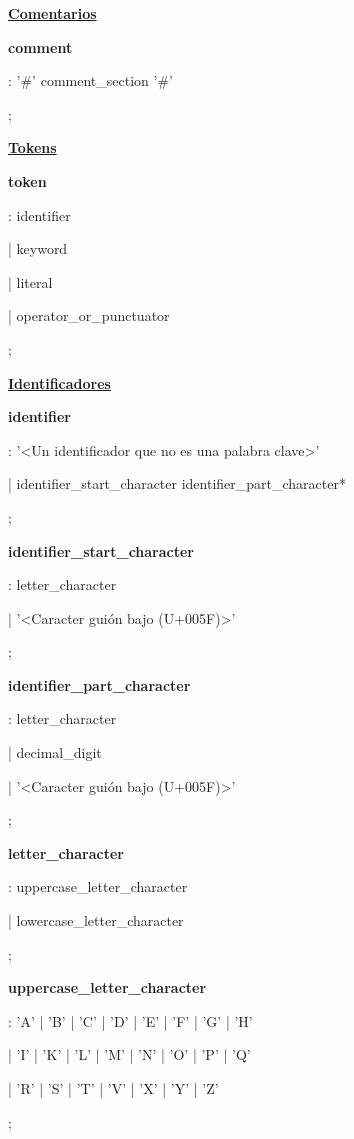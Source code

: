 		\underline{\textbf{Comentarios}}\par
		\textbf{comment}\par
		: '\#' comment\_section '\#'\par
		;\par
		
		\underline{\textbf{Tokens}}\par
		\textbf{token}\par
		: identifier\par
		| keyword\par
		| literal\par
		| operator\_or\_punctuator\par
		;\par
		
		\underline{\textbf{Identificadores}}\par
		\textbf{identifier}\par
		: '<Un identificador que no es una palabra clave>'\par
		| identifier\_start\_character identifier\_part\_character*\par
		;\par
		
		\textbf{identifier\_start\_character}\par
		: letter\_character\par
		| '<Caracter guión bajo (U+005F)>'\par
		;\par
		
		\textbf{identifier\_part\_character}\par
		: letter\_character\par
		| decimal\_digit\par
		| '<Caracter guión bajo (U+005F)>'\par
		;\par
		
		\textbf{letter\_character}\par
		: uppercase\_letter\_character\par
		| lowercase\_letter\_character\par
		;\par
		
		\textbf{uppercase\_letter\_character}\par
		: 'A' | 'B' | 'C' | 'D' | 'E' | 'F' | 'G' | 'H'\par 
		| 'I' | 'K' | 'L' | 'M' | 'N' | 'O' | 'P' | 'Q'\par 
		| 'R' | 'S' | 'T' | 'V' | 'X' | 'Y' | 'Z'\par    
		;\par
		
